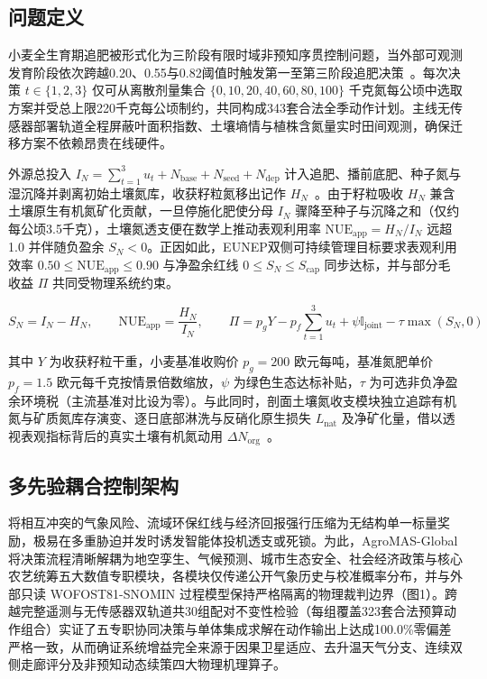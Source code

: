 \documentclass[11pt,a4paper]{article}
\begin{document}
\subsection{问题定义}

小麦全生育期追肥被形式化为三阶段有限时域非预知序贯控制问题，当外部可观测发育阶段依次跨越0.20、0.55与0.82阈值时触发第一至第三阶段追肥决策~\citep{ceglar2019,baja2025}。每次决策 $t \in \{1, 2, 3\}$ 仅可从离散剂量集合 $\{0, 10, 20, 40, 60, 80, 100\}$ 千克氮每公顷中选取方案并受总上限220千克每公顷制约，共同构成343套合法全季动作计划。主线无传感器部署轨道全程屏蔽叶面积指数、土壤墒情与植株含氮量实时田间观测，确保迁移方案不依赖昂贵在线硬件。

外源总投入 $I_N = \sum_{t=1}^{3} u_t + N_{\text{base}} + N_{\text{seed}} + N_{\text{dep}}$ 计入追肥、播前底肥、种子氮与湿沉降并剥离初始土壤氮库，收获籽粒氮移出记作 $H_N$~\citep{eunep2015}。由于籽粒吸收 $H_N$ 兼含土壤原生有机氮矿化贡献，一旦停施化肥使分母 $I_N$ 骤降至种子与沉降之和（仅约每公顷3.5千克），土壤氮透支便在数学上推动表观利用率 $\text{NUE}_{\text{app}} = H_N / I_N$ 远超 1.0 并伴随负盈余 $S_N < 0$。正因如此，EUNEP双侧可持续管理目标要求表观利用效率 $0.50 \le \text{NUE}_{\text{app}} \le 0.90$ 与净盈余红线 $0 \le S_N \le S_{\text{cap}}$ 同步达标，并与部分毛收益 $\Pi$ 共同受物理系统约束。

\begin{equation}
S_N = I_N - H_N, \qquad \text{NUE}_{\text{app}} = \frac{H_N}{I_N}, \qquad \Pi = p_g Y - p_f \sum_{t=1}^{3} u_t + \psi \mathbb{I}_{\text{joint}} - \tau \max(S_N, 0)
\end{equation}

其中 $Y$ 为收获籽粒干重，小麦基准收购价 $p_g = 200$ 欧元每吨，基准氮肥单价 $p_f = 1.5$ 欧元每千克按情景倍数缩放，$\psi$ 为绿色生态达标补贴，$\tau$ 为可选非负净盈余环境税（主流基准对比设为零）。与此同时，剖面土壤氮收支模块独立追踪有机氮与矿质氮库存演变、逐日底部淋洗与反硝化原生损失 $L_{\text{nat}}$ 及净矿化量，借以透视表观指标背后的真实土壤有机氮动用 $\Delta N_{\text{org}}$~\citep{silva2021,dewit2019}。

\subsection{多先验耦合控制架构}

将相互冲突的气象风险、流域环保红线与经济回报强行压缩为无结构单一标量奖励，极易在多重胁迫并发时诱发智能体投机透支或死锁。为此，AgroMAS-Global 将决策流程清晰解耦为地空孪生、气候预测、城市生态安全、社会经济政策与核心农艺统筹五大数值专职模块，各模块仅传递公开气象历史与校准概率分布，并与外部只读 WOFOST81-SNOMIN 过程模型保持严格隔离的物理裁判边界（图1）。跨越完整遥测与无传感器双轨道共30组配对不变性检验（每组覆盖323套合法预算动作组合）实证了五专职协同决策与单体集成求解在动作输出上达成100.0\%零偏差严格一致，从而确证系统增益完全来源于因果卫星适应、去升温天气分支、连续双侧走廊评分及非预知动态续策四大物理机理算子。
\end{document}
